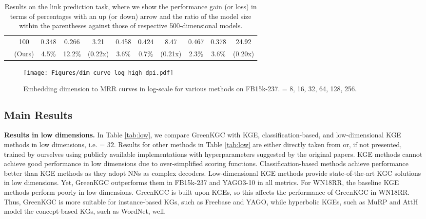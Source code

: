 \documentclass{article}
\begin{document}
\begin{table*}[!t]
\begin{tabular}{l|c | ccc | ccc | ccc}
\cline{2-11}

& 100
& 0.348 & 0.266 & 3.21 
& 0.458 & 0.424 & 8.47 
& 0.467 & 0.378 & 24.92 \\
& (Ours)
& \textcolor{green}{} 4.5\% & \textcolor{green}{} 12.2\% & (0.22x)
& \textcolor{red}{} 3.6\% & \textcolor{red}{} 0.7\% & (0.21x) 
& \textcolor{red}{} 2.3\% & \textcolor{red}{} 3.6\% & (0.20x) \\
\hline
\end{tabular}
\caption{Results on the link prediction task, where we show the
performance gain (or loss) in terms of percentages with an up (or down)
arrow and the ratio of the model size within the parentheses against
those of respective 500-dimensional models.} \label{tab:main}
\end{table*}


\begin{figure}[t]
\centering
\texttt{[image: Figures/dim\_curve\_log\_high\_dpi.pdf]}
\caption{Embedding dimension  to MRR curves in log-scale for various 
methods on FB15k-237.  = 8, 16, 32, 64, 128, 256.}\label{fig:dim_curve}
\end{figure}


\subsection{Main Results}

\textbf{Results in low dimensions.} In Table \ref{tab:low}, we compare
GreenKGC with KGE, classification-based, and low-dimensional KGE methods in
low dimensions, i.e.  = 32. Results for other methods in Table \ref{tab:low} 
are either directly taken from \citep{chami2020low, zhu2022dualde}
or, if not presented, trained by ourselves using publicly available 
implementations with hyperparameters suggested by the original papers.
KGE methods cannot achieve good performance in low dimensions 
due to over-simplified scoring functions. Classification-based methods achieve 
performance better than KGE methods as they adopt NNs as complex
decoders. Low-dimensional KGE methods provide state-of-the-art 
KGC solutions in low dimensions. Yet, GreenKGC outperforms them 
in FB15k-237 and YAGO3-10 in all metrics.
{\color{black}
For WN18RR, the baseline KGE methods perform poorly in low dimensions.
GreenKGC is built upon
KGEs, so this affects the performance of GreenKGC in WN18RR. 
Thus, GreenKGC is more suitable for instance-based KGs, such as 
Freebase and YAGO, while hyperbolic KGEs, such as MuRP and AttH model
the concept-based KGs, such as WordNet, well.
}
\end{document}
